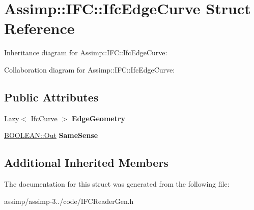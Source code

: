 \hypertarget{struct_assimp_1_1_i_f_c_1_1_ifc_edge_curve}{\section{Assimp\+:\+:I\+F\+C\+:\+:Ifc\+Edge\+Curve Struct Reference}
\label{struct_assimp_1_1_i_f_c_1_1_ifc_edge_curve}
}


Inheritance diagram for Assimp\+:\+:I\+F\+C\+:\+:Ifc\+Edge\+Curve\+:


Collaboration diagram for Assimp\+:\+:I\+F\+C\+:\+:Ifc\+Edge\+Curve\+:
\subsection*{Public Attributes}
\begin{DoxyCompactItemize}
\item 
\hypertarget{struct_assimp_1_1_i_f_c_1_1_ifc_edge_curve_a8068083702e1ebb0921105f178d924bc}{\hyperlink{struct_assimp_1_1_s_t_e_p_1_1_lazy}{Lazy}$<$ \hyperlink{struct_assimp_1_1_i_f_c_1_1_ifc_curve}{Ifc\+Curve} $>$ {\bfseries Edge\+Geometry}}\label{struct_assimp_1_1_i_f_c_1_1_ifc_edge_curve_a8068083702e1ebb0921105f178d924bc}

\item 
\hypertarget{struct_assimp_1_1_i_f_c_1_1_ifc_edge_curve_a45fa3b54f660fc241e92952e12485227}{\hyperlink{classboost_1_1shared__ptr}{B\+O\+O\+L\+E\+A\+N\+::\+Out} {\bfseries Same\+Sense}}\label{struct_assimp_1_1_i_f_c_1_1_ifc_edge_curve_a45fa3b54f660fc241e92952e12485227}

\end{DoxyCompactItemize}
\subsection*{Additional Inherited Members}


The documentation for this struct was generated from the following file\+:\begin{DoxyCompactItemize}
\item 
assimp/assimp-\/3../code/I\+F\+C\+Reader\+Gen.\+h\end{DoxyCompactItemize}
